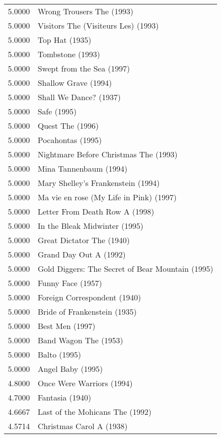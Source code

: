 \begin{flushleft}
\begin{table}[h]
\centering
\setlength{\tabcolsep}{12pt}
\begin{tabular}{|ll|}
\hline
5.0000 & Wrong Trousers The (1993)                        \\
5.0000 & Visitors The (Visiteurs Les) (1993)              \\
5.0000 & Top Hat (1935)                                   \\
5.0000 & Tombstone (1993)                                 \\
5.0000 & Swept from the Sea (1997)                        \\
5.0000 & Shallow Grave (1994)                             \\
5.0000 & Shall We Dance? (1937)                           \\
5.0000 & Safe (1995)                                      \\
5.0000 & Quest The (1996)                                 \\
5.0000 & Pocahontas (1995)                                \\
5.0000 & Nightmare Before Christmas The (1993)            \\
5.0000 & Mina Tannenbaum (1994)                           \\
5.0000 & Mary Shelley's Frankenstein (1994)               \\
5.0000 & Ma vie en rose (My Life in Pink) (1997)          \\
5.0000 & Letter From Death Row A (1998)                   \\
5.0000 & In the Bleak Midwinter (1995)                    \\
5.0000 & Great Dictator The (1940)                        \\
5.0000 & Grand Day Out A (1992)                           \\
5.0000 & Gold Diggers: The Secret of Bear Mountain (1995) \\
5.0000 & Funny Face (1957)                                \\
5.0000 & Foreign Correspondent (1940)                     \\
5.0000 & Bride of Frankenstein (1935)                     \\
5.0000 & Best Men (1997)                                  \\
5.0000 & Band Wagon The (1953)                            \\
5.0000 & Balto (1995)                                     \\
5.0000 & Angel Baby (1995)                                \\ \hline
4.8000 & Once Were Warriors (1994)                        \\ \hline
4.7000 & Fantasia (1940)                                  \\ \hline
4.6667 & Last of the Mohicans The (1992)                  \\ \hline
4.5714 & Christmas Carol A (1938)                         \\ \hline


\end{tabular}
\end{table}
\end{flushleft}
